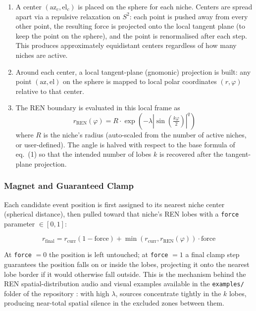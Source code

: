 \documentclass[11pt,a4paper]{article}
\begin{document}
\begin{enumerate}
  \item A center $(\text{az}_c, \text{el}_c)$ is placed on the sphere for
  each niche. Centers are spread apart via a repulsive relaxation on
  $S^2$: each point is pushed away from every other point, the resulting
  force is projected onto the local tangent plane (to keep the point on
  the sphere), and the point is renormalised after each step. This
  produces approximately equidistant centers regardless of how many
  niches are active.
  \item Around each center, a local tangent-plane (gnomonic) projection is
  built: any point $(\text{az}, \text{el})$ on the sphere is mapped to
  local polar coordinates $(r, \varphi)$ relative to that center.
  \item The REN boundary is evaluated in this local frame as
  \begin{equation}
    r_{\text{REN}}(\varphi) = R \cdot \exp\!\left(-\lambda
    \left|\sin\!\left(\tfrac{k\varphi}{2}\right)\right|^q\right)
    \label{eq:ren_local}
  \end{equation}
  where $R$ is the niche's radius (auto-scaled from the number of active
  niches, or user-defined). The angle is halved with respect to the base
  formula of eq.~(1) so that the intended number of lobes $k$ is recovered
  after the tangent-plane projection.
\end{enumerate}

\subsubsection{Magnet and Guaranteed Clamp}

Each candidate event position is first assigned to its nearest niche
center (spherical distance), then pulled toward that niche's REN lobes
with a \texttt{force} parameter $\in [0,1]$:

\begin{equation}
r_{\text{final}} = r_{\text{curr}}(1-\text{force}) +
\min(r_{\text{curr}}, r_{\text{REN}}(\varphi))\cdot\text{force}
\end{equation}

At \texttt{force} $=0$ the position is left untouched; at \texttt{force}
$=1$ a final clamp step guarantees the position falls on or inside the
lobes, projecting it onto the nearest lobe border if it would otherwise
fall outside. This is the mechanism behind the REN spatial-distribution
audio and visual examples available in the \texttt{examples/} folder of
the repository \cite{hutchinsonrepo2026}: with high $\lambda$, sources
concentrate tightly in the $k$ lobes, producing near-total spatial silence
in the excluded zones between them.
\end{document}
